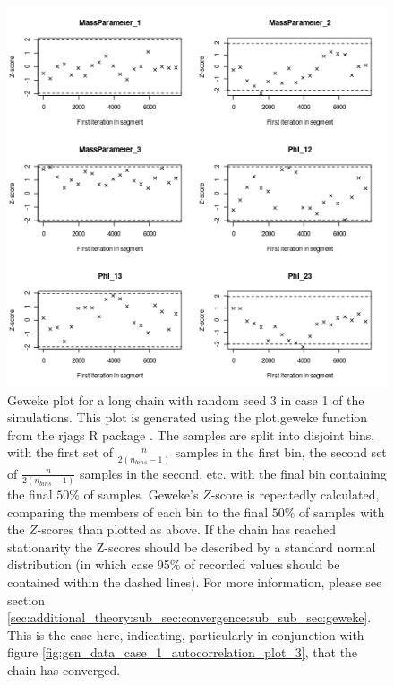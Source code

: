 \documentclass[12pt]{article} %
\begin{document}
	\begin{figure}[!htb]
		\centering
		\includegraphics[scale=0.65]{Images/Gen_data/Case_1/Geweke_plot_3.png}
		\caption{Geweke plot \citep{GewekeEvaluatingAccuracySamplingBased} for a long chain with random seed 3 in case 1 of the simulations. 	This plot is generated using the plot.geweke function from the rjags R package \citep{PlummerRjags2018}. The samples are split into disjoint bins, with the first set of $\frac{n}{2(n_{bins} -1)}$ samples in the first bin, the second set of $\frac{n}{2(n_{bins} -1)}$ samples in the second, etc. with the final bin containing the final $50\%$ of samples. Geweke's $Z$-score \citep{GewekeEvaluatingAccuracySamplingBased} is repeatedly calculated, comparing the members of each bin to the final $50\%$ of samples with the $Z$-scores than plotted as above. If the chain has reached stationarity the Z-scores should be described by a standard normal distribution (in which case 95\% of recorded values should be contained within the dashed lines). For more information, please see section \ref{sec:additional_theory:sub_sec:convergence:sub_sub_sec:geweke}. This is the case here, indicating, particularly in conjunction with figure \ref{fig:gen_data_case_1_autocorrelation_plot_3}, that the chain has converged.}
		\label{fig:gen_data_case_1_geweke_plot_3}
	\end{figure}
		
	
\end{document}
